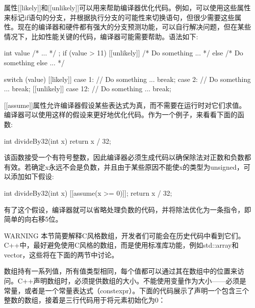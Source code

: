 
属性[[likely]]和[[unlikely]]可以用来帮助编译器优化代码。例如，可以使用这些属性来标记if语句的分支，并根据执行分支的可能性来切换语句，但很少需要这些属性。现在的编译器和硬件都有强大的分支预测功能，可以自行解决问题，但在某些情况下，比如性能关键的代码，编译器可能需要帮助。语法如下:

\begin{cpp}
int value { /* ... */ };
if (value > 11) [[unlikely]] { /* Do something ... */ }
else { /* Do something else ... */ }

switch (value)
{
    [[likely]] case 1:
        // Do something ...
        break;
    case 2:
        // Do something ...
        break;
    [[unlikely]] case 12:
        // Do something ...
        break;
}
\end{cpp}


\mySamllsection{[[assume]]}

[[assume]]属性允许编译器假设某些表达式为真，而不需要在运行时对它们求值。编译器可以使用这样的假设来更好地优化代码。作为一个例子，来看看下面的函数:

\begin{cpp}
int divideBy32(int x)
{
    return x / 32;
}
\end{cpp}

该函数接受一个有符号整数，因此编译器必须生成代码以确保除法对正数和负数都有效。若确定x永远不会是负数，并且由于某些原因不能使x的类型为unsigned，可以添加如下假设:

\begin{cpp}
int divideBy32(int x)
{
    [[assume(x >= 0)]];
    return x / 32;
}
\end{cpp}

有了这个假设，编译器就可以省略处理负数的代码，并将除法优化为一条指令，即简单的向右移5位。


\begin{myWarning}{WARNING}
本节简要解释C风格数组，开发者们可能会在历史代码中看到它们。C++中，最好避免使用C风格的数组，而是使用标准库功能，例如std::array和vector，这些将在下面的两节中讨论。
\end{myWarning}

数组持有一系列值，所有值类型相同，每个值都可以通过其在数组中的位置来访问。C++声明数组时，必须提供数组的大小。不能使用变量作为大小——必须是常量，或者是一个常量表达式（constexpr）。下面的代码展示了声明一个包含三个整数的数组，接着是三行代码用于将元素初始化为0：

